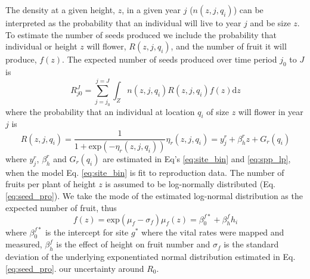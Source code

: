 \documentclass[12pt,a4paper]{article}
\begin{document}
The density at a given height, $z$, in a given year $j$ ($n(z, j, q_i)$) can be interpreted as the probability that an individual will live to year $j$ and be size $z$. To estimate the number of seeds produced we include the probability that individual or height $z$ will flower, $R(z, j, q_i)$, and the number of fruit it will produce, $f(z)$. The expected number of seeds produced over time period $j_0$ to $J$ is
\begin{equation}\label{eq:R0}
	R_{j0}^J = \sum_{j = j_0}^{j = J} \int_Z n(z, j, q_i)R(z, j, q_i)f(z)\text{d}z
\end{equation}
where the probability that an individual at location $q_i$ of size $z$ will flower in year $j$ is 
\begin{subequations}
\label{eq:prob_flower}
\begin{equation}
	R(z, j, q_i) = \frac{1}{1 + \text{exp}(-\eta_r(z, j, q_i))}
\end{equation}
\begin{equation}
	\eta_r(z, j, q_i) = y_j^r + \beta_h^r z + G_r(q_i)
\end{equation}
\end{subequations}
where $y_j^r$, $\beta_h^r$ and $G_r(q_i)$ are estimated in Eq's \ref{eq:site_bin} and \ref{eq:spp_lp}, when the model Eq. \ref{eq:site_bin} is fit to reproduction data. The number of fruits per plant of height $z$ is assumed to be log-normally distributed (Eq. \ref{eq:seed_pro}). We take the mode of the estimated log-normal distribution as the expected number of fruit, thus
\begin{subequations}
\begin{equation}
	f(z) = \text{exp}(\mu_f - \sigma_f)
\end{equation}
\begin{equation}
	\mu_f(z) = \beta_0^{f*} + \beta_h^f h_i
\end{equation}      
\end{subequations}
where $\beta_0^{f*}$ is the intercept for site $g^*$ where the vital rates were mapped and measured, $\beta_h^f$ is the effect of height on fruit number and $\sigma_f$ is the standard deviation of the underlying exponentiated normal distribution estimated in Eq. \ref{eq:seed_pro}. 
 our uncertainty around $R_0$.        
\end{document}

